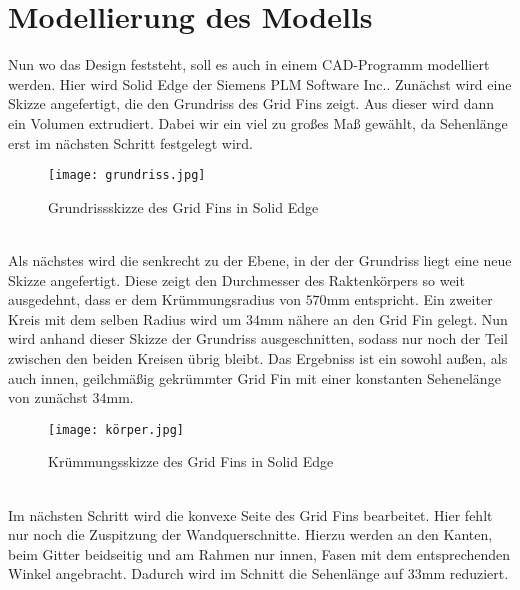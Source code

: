 \section{Modellierung des Modells}
Nun wo das Design feststeht, soll es auch in einem CAD-Programm modelliert werden. Hier wird Solid Edge der Siemens PLM Software Inc.. Zunächst wird eine Skizze angefertigt, die den Grundriss des Grid Fins zeigt. Aus dieser wird dann ein Volumen extrudiert. Dabei wir ein viel zu großes Maß gewählt, da Sehenlänge erst im nächsten Schritt festgelegt wird.
\begin{figure}[h]
	\centering
	\texttt{[image: grundriss.jpg]}
	\caption{Grundrissskizze des Grid Fins in Solid Edge}
	\label{abb_grundriss}
\end{figure}\\
Als nächstes wird die senkrecht zu der Ebene, in der der Grundriss liegt eine neue Skizze angefertigt. Diese zeigt den Durchmesser des Raktenkörpers so weit ausgedehnt, dass er dem Krümmungsradius von $570$mm entspricht. Ein zweiter Kreis mit dem selben Radius wird um $34$mm nähere an den Grid Fin gelegt. Nun wird anhand dieser Skizze der Grundriss ausgeschnitten, sodass nur noch der Teil zwischen den beiden Kreisen übrig bleibt. Das Ergebniss ist ein sowohl außen, als auch innen, geilchmäßig gekrümmter Grid Fin mit einer konstanten Sehenelänge von zunächst $34$mm.
\begin{figure}[h]
	\centering
	\texttt{[image: körper.jpg]}
	\caption{Krümmungsskizze des Grid Fins in Solid Edge}
	\label{abb_körper}
\end{figure}\\
Im nächsten Schritt wird die konvexe Seite des Grid Fins bearbeitet. Hier fehlt nur noch die Zuspitzung der Wandquerschnitte. Hierzu werden an den Kanten, beim Gitter beidseitig und am Rahmen nur innen, Fasen mit dem entsprechenden Winkel angebracht. Dadurch wird im Schnitt die Sehenlänge auf $33$mm reduziert.